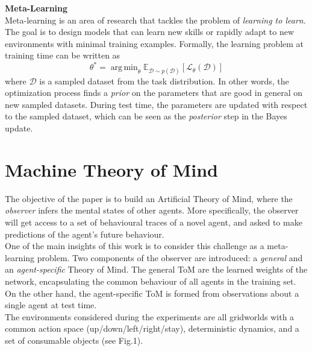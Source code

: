 \documentclass[twocolumn,superscriptaddress,aps]{revtex4-1}
\DeclareMathOperator*{\argmin}{arg\,min}
\begin{document}
\noindent \textbf{Meta-Learning} \\[0.15cm]
Meta-learning \cite{Schmidhuber} is an area of research that tackles the problem of \textit{learning to learn}. The goal is to design models that can learn new skills or rapidly adapt to new environments with minimal training examples. Formally, the learning problem at training time can be written as
\begin{equation}
\theta^* = \argmin_\theta \mathbb{E}_{\mathcal{D} \sim p(\mathcal{D})}[\mathcal{L}_\theta(\mathcal{D})]
\label{eq:meta}
\end{equation}
where $\mathcal{D}$ is a sampled dataset from the task distribution. In other words, the optimization process finds a \textit{prior} on the parameters that are good in general on new sampled datasets. During test time, the parameters are updated with respect to the sampled dataset, which can be seen as the \textit{posterior} step in the Bayes update.

\section{Machine Theory of Mind}\label{sec:machinetom}
The objective of the paper \cite{Tomnet} is to build an Artificial Theory of Mind, where the \textit{observer} infers the mental states of other agents. More specifically, the observer will get access to a set of behavioural traces of a novel agent, and asked to make predictions of the agent's future behaviour. \\

One of the main insights of this work is to consider this challenge as a meta-learning problem. Two components of the observer are introduced: a \textit{general} and an \textit{agent-specific} Theory of Mind. The general ToM are the learned weights of the network, encapsulating the common behaviour of all agents in the training set. On the other hand, the agent-specific ToM is formed from observations about a single agent at test time. \\

The environments considered during the experiments are all gridworlds with a common action space (up/down/left/right/stay), deterministic dynamics, and a set of consumable objects (see Fig.1).\\
\end{document}
